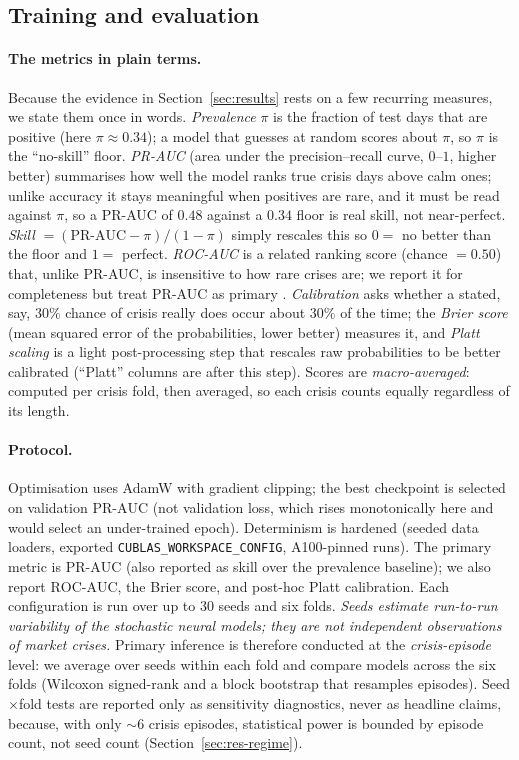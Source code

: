 \documentclass[11pt,a4paper]{article}
\newcommand{\prauc}{\mbox{PR-AUC}}
\newcommand{\rocauc}{\mbox{ROC-AUC}}
\begin{document}
\subsection{Training and evaluation}

\paragraph{The metrics in plain terms.} Because the evidence in
Section~\ref{sec:results} rests on a few recurring measures, we state them once
in words. \emph{Prevalence} $\pi$ is the fraction of test days that are
positive (here $\pi\approx0.34$); a model that guesses at random scores about
$\pi$, so $\pi$ is the ``no-skill'' floor. \emph{PR-AUC} (area under the
precision--recall curve, $0$--$1$, higher better) summarises how well the model
ranks true crisis days above calm ones; unlike accuracy it stays meaningful
when positives are rare, and it must be read against $\pi$, so a PR-AUC of
$0.48$ against a $0.34$ floor is real skill, not near-perfect. \emph{Skill}
$=(\prauc-\pi)/(1-\pi)$ simply rescales this so $0=$ no better than the floor
and $1=$ perfect. \emph{ROC-AUC} is a related ranking score (chance $=0.50$)
that, unlike PR-AUC, is insensitive to how rare crises are; we report it for
completeness but treat PR-AUC as primary
\citep{saito2015prc}. \emph{Calibration} asks whether a stated, say, $30\%$
chance of crisis really does occur about $30\%$ of the time; the \emph{Brier
score} (mean squared error of the probabilities, lower better) measures it, and
\emph{Platt scaling} is a light post-processing step that rescales raw
probabilities to be better calibrated (``Platt'' columns are after this step).
Scores are \emph{macro-averaged}: computed per crisis fold, then averaged, so
each crisis counts equally regardless of its length.

\paragraph{Protocol.}
Optimisation uses AdamW with gradient clipping; the best checkpoint is selected
on validation $\prauc$ (not validation loss, which rises monotonically here
and would select an under-trained epoch). Determinism is hardened
(seeded data loaders, exported \texttt{CUBLAS\_WORKSPACE\_CONFIG}, A100-pinned
runs). The primary metric is $\prauc$ (also reported as skill over the
prevalence baseline); we also report $\rocauc$, the Brier score, and post-hoc
Platt calibration. Each configuration is run over up to 30 seeds and six folds.
\emph{Seeds estimate run-to-run variability of the stochastic neural models;
they are not independent observations of market crises.} Primary inference is
therefore conducted at the \emph{crisis-episode} level: we average over seeds
within each fold and compare models across the six folds (Wilcoxon signed-rank
and a block bootstrap that resamples episodes). Seed$\times$fold tests are
reported only as sensitivity diagnostics, never as headline claims, because,
with only $\sim$6 crisis episodes, statistical power is bounded by episode
count, not seed count (Section~\ref{sec:res-regime}).
\end{document}

